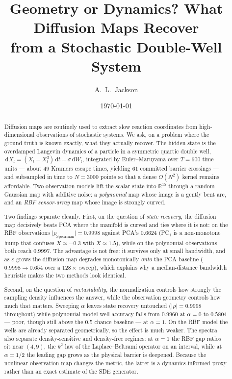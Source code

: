 \documentclass[11pt]{article}
\title{\bf Geometry or Dynamics? What Diffusion Maps Recover\\
from a Stochastic Double-Well System}
\author{A.\ L.\ Jackson}
\date{\today}
\newcommand{\R}{\mathbb{R}}
\newcommand{\dd}{\,\mathrm{d}}
\newcommand{\eps}{\varepsilon}
\begin{document}
\maketitle

\begin{abstract}
Diffusion maps are routinely used to extract slow reaction coordinates from
high-dimensional observations of stochastic systems. We ask, on a problem where
the ground truth is known exactly, what they actually recover. The hidden state
is the overdamped Langevin dynamics of a particle in a symmetric quartic double
well, $\dd X_t = (X_t - X_t^3)\dd t + \sigma\dd W_t$, integrated by
Euler--Maruyama over $T = 600$ time units --- about $49$ Kramers escape times,
yielding $61$ committed barrier crossings --- and subsampled in time to $N=3000$
points so that a dense $O(N^2)$ kernel remains affordable. Two observation models
lift the scalar state into $\R^{15}$ through a random Gaussian map with additive
noise: a \emph{polynomial} map whose image is a gently bent arc, and an
\emph{RBF sensor-array} map whose image is strongly curved.

Two findings separate cleanly. First, on the question of \emph{state recovery},
the diffusion map decisively beats PCA where the manifold is curved and ties
where it is not: on the RBF observations
$\lvert\rho_{\mathrm{Spearman}}\rvert = 0.9998$ against PCA's $0.6624$ (PC$_1$
is a non-monotone hump that confuses $X \approx -0.3$ with $X \approx 1.5$),
while on the polynomial observations both reach $0.9997$. The advantage is not
free: it survives only at small bandwidth, and as $\eps$ grows the diffusion map
degrades monotonically \emph{onto} the PCA baseline ($0.9998 \to 0.654$ over a
$128\times$ sweep), which explains why a median-distance bandwidth heuristic
makes the two methods look identical.

Second, on the question of \emph{metastability}, the normalization controls how
strongly the sampling density influences the answer, while the observation
geometry controls how much that matters. Sweeping $\alpha$ leaves state recovery
untouched ($\lvert\rho\rvert = 0.9998$ throughout) while polynomial-model well
accuracy falls from $0.9960$ at $\alpha=0$ to $0.5804$ --- poor, though still
above the $0.5$ chance baseline --- at $\alpha=1$. On the RBF model the wells are
already separated geometrically, so the effect is much weaker. The spectra also
separate density-sensitive and density-free regimes: at $\alpha=1$ the RBF gap
ratios sit near $(4,9)$, the $k^2$ law of the Laplace--Beltrami operator on an
interval, while at $\alpha=1/2$ the leading gap grows as the physical barrier is
deepened. Because the nonlinear observation map changes the metric, the latter
is a dynamics-informed proxy rather than an exact estimate of the SDE generator.


\end{abstract}
\end{document}
